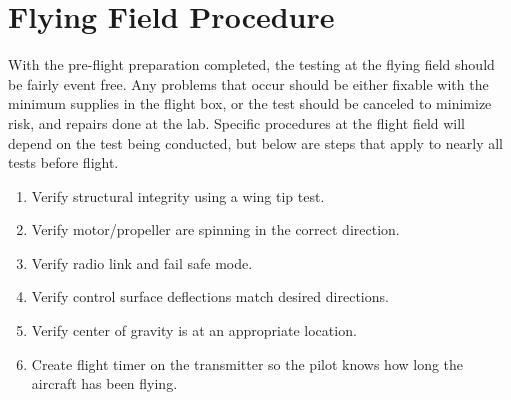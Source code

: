 \section{Flying Field Procedure}
With the pre-flight preparation completed, the testing at the flying field should be fairly event free. Any problems that occur should be either fixable with the minimum supplies in the flight box, or the test should be canceled to minimize risk, and repairs done at the lab. Specific procedures at the flight field will depend on the test being conducted, but below are steps that apply to nearly all tests before flight.
\begin{enumerate}
\item Verify structural integrity using a wing tip test.
\item Verify motor/propeller are spinning in the correct direction.
\item Verify radio link and fail safe mode.
\item Verify control surface deflections match desired directions.
\item Verify center of gravity is at an appropriate location.
\item Create flight timer on the transmitter so the pilot knows how long the aircraft has been flying.
\end{enumerate}